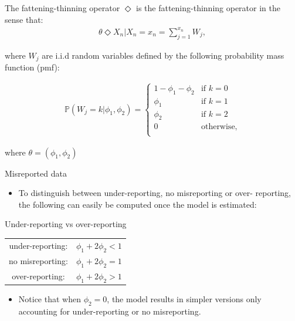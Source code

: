 \documentclass[aspectratio=169,usepdftitle=true]{beamer}
\begin{document}
\begin{frame}{The fattening-thinning operator}
\noindent $\Diamond$ is the fattening-thinning operator in the sense that:
\begin{align}\label{eq1:fatteringthinning}
\theta \Diamond X_n|X_n=x_n=\sum_{j=1}^{x_n}W_j,
\end{align}

\noindent where $W_j$ are i.i.d random variables defined by the following probability mass function (pmf):

\begin{align}\label{eq2:pmfW}
\mathbb{P}(W_j=k|\phi_1,\phi_2)=\begin{cases} 
1-\phi_1-\phi_2 & \textrm{if } k=0  \\
\phi_1 & \textrm{if } k=1  \\
\phi_2 & \textrm{if } k=2  \\
0 & \textrm{otherwise}, \\
\end{cases}
\end{align}

\noindent where $\theta=(\phi_1,\phi_2)$
\end{frame}

\begin{frame}{Misreported data}
\begin{itemize}
 \item To distinguish between under-reporting, no misreporting or over-
reporting, the following can easily be computed once the model
is estimated:
\end{itemize}
\begin{block}{Under-reporting vs over-reporting}
\begin{table}
\begin{tabular}[h]{cc}
under-reporting: & $\phi_1 + 2 \phi_2 < 1$ \\
no misreporting: & $\phi_1 + 2 \phi_2 = 1$ \\
over-reporting: & $\phi_1 + 2 \phi_2 > 1$
\end{tabular}
\end{table}
\end{block}
\begin{itemize}
 \item Notice that when $\phi_2 = 0$, the model results in simpler versions only accounting for under-reporting or no misreporting.
\end{itemize}
\end{frame}
\end{document}
